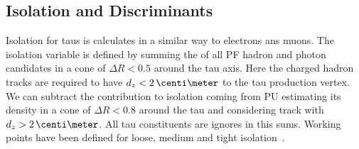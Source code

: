 % 
% 

\subsection{Isolation and Discriminants}
\label{SECTION:EventReconstructionAndSimulation_Taus_IsolationAndDiscriminants}


Isolation for taus is calculates in a similar way to electrons ans muons. The isolation variable is defined by summing the \pt of all \gls{PF} hadron and photon candidates in a cone of $\Delta R < 0.5$ around the tau axis. Here the charged hadron tracks are required to have $d_z < 2\,\centi\meter$ to the tau production vertex. We can subtract the contribution to isolation coming from \gls{PU} estimating its density in a cone of $\Delta R < 0.8$ around the tau and considering track with $d_z > 2\,\centi\meter$. All tau constituents are ignores in this sums. Working points have been defined for loose, medium and tight isolation~\cite{ARTICLE:CMSReconstructionIndentificationTau}.

